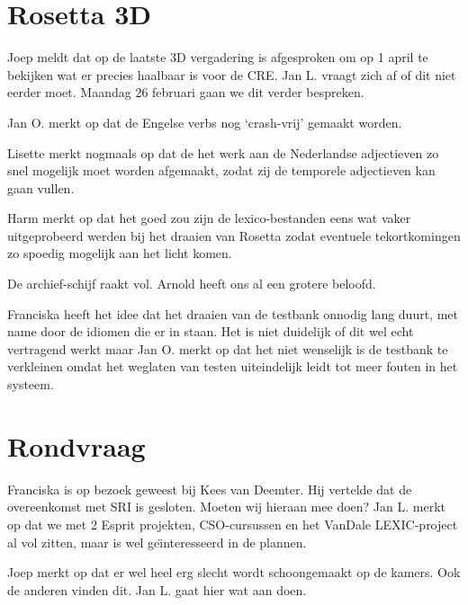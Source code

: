 \section {Rosetta 3D}

Joep meldt dat op de laatste 3D vergadering is afgesproken om op 1 april te 
bekijken wat er precies haalbaar is voor de CRE. Jan L. vraagt zich af of dit 
niet eerder moet. Maandag 26 februari gaan we dit verder bespreken.

Jan O. merkt op dat de Engelse verbs nog `crash-vrij' gemaakt worden.

Lisette merkt nogmaals op dat de het werk aan de Nederlandse adjectieven 
zo snel mogelijk moet worden afgemaakt, zodat zij de temporele adjectieven kan 
gaan vullen.

Harm merkt op dat het goed zou zijn de lexico-bestanden eens wat vaker 
uitgeprobeerd werden bij het draaien van Rosetta zodat eventuele tekortkomingen 
zo spoedig mogelijk aan het licht komen.

De archief-schijf raakt vol. Arnold heeft ons al een grotere beloofd.

Franciska heeft het idee dat het draaien van de testbank onnodig lang duurt, 
met name door de idiomen die er in staan. Het is niet duidelijk of dit wel echt 
vertragend werkt maar Jan O. merkt op dat het niet wenselijk is de testbank te
verkleinen omdat het weglaten van testen uiteindelijk leidt tot meer fouten in 
het systeem.


\section {Rondvraag}

Franciska is op bezoek geweest bij Kees van Deemter. Hij vertelde dat de 
overeenkomst met SRI is gesloten. Moeten wij hieraan mee doen? Jan L. merkt op 
dat we met 2 Esprit projekten, CSO-cursussen en het VanDale LEXIC-project al 
vol zitten, maar is wel ge\"{\i}nteresseerd in de plannen.

Joep merkt op dat er wel heel erg slecht wordt schoongemaakt op de kamers. Ook 
de anderen vinden dit. Jan L. gaat hier wat aan doen.


